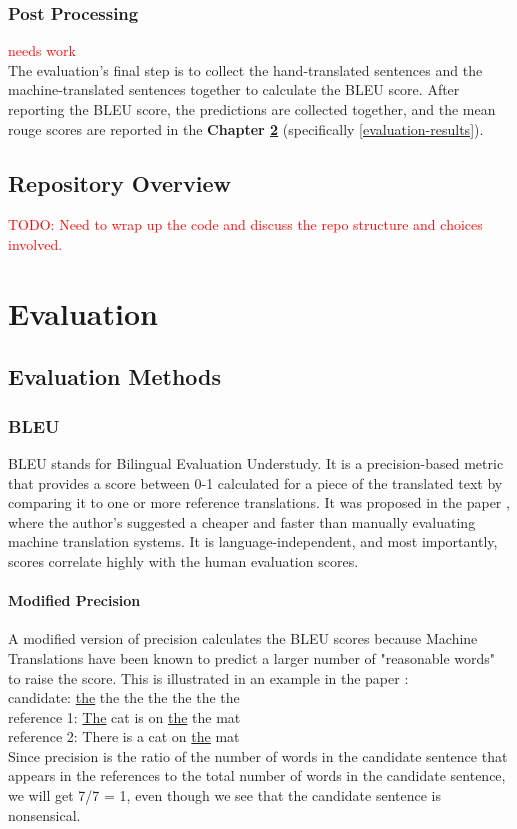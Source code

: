 \documentclass[12pt,a4paper,twoside,openright]{report}
\newcommand{\red}[1]{\textcolor{red}{#1}}
\newcommand{\changedFont}[1]{{\fontfamily{qcr}\selectfont #1}}
\begin{document}
\subsection{Post Processing}
\label{postprocessing}

\red{needs work}\\
The evaluation's final step is to collect the hand-translated sentences and the machine-translated sentences together to calculate the BLEU score. After reporting the BLEU score, the predictions are collected together, and the mean rouge scores are reported in the \textbf{Chapter \ref{evaluation} } (specifically \ref{evaluation-results}). 


\section{Repository Overview}
\red{TODO: Need to wrap up the code and discuss the repo structure and choices involved.}


\chapter{Evaluation}
\label{evaluation}

\section{Evaluation Methods}
\label{evaluation-methods}

\subsection{BLEU}
\label{bleu}

BLEU stands for Bilingual Evaluation Understudy. It is a precision-based metric that provides a score between 0-1 calculated for a piece of the translated text by comparing it to one or more reference translations. It was proposed in the paper \cite{bleu}, where the author's suggested a cheaper and faster than manually evaluating machine translation systems. It is language-independent, and most importantly, scores correlate highly with the human evaluation scores. 

\subsubsection{Modified Precision}
A modified version of precision calculates the BLEU scores because Machine Translations have been known to predict a larger number of "reasonable words" to raise the score. This is illustrated in an example in the paper \cite{bleu}: \\
candidate: \changedFont{\underline{the} the the the the the the}\\
reference 1: \changedFont{\underline{The} cat is on \underline{the} the mat}\\
reference 2: \changedFont{There is a cat on \underline{the} mat}\\
Since precision is the ratio of the number of words in the candidate sentence that appears in the references to the total number of words in the candidate sentence, we will get 7/7 = 1, even though we see that the candidate sentence is nonsensical. 
\end{document}
